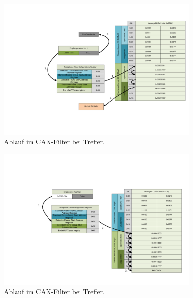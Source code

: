 \begin{figure}
	\centering
		\includegraphics[width=0.9\textwidth]{images/canfilterhit.pdf}
	\caption{Ablauf im CAN-Filter bei Treffer.}
	\label{fig.canfilterhit}
\end{figure}

\begin{figure}
	\centering
		\includegraphics[width=0.9\textwidth]{images/canfiltermiss.pdf}
	\caption{Ablauf im CAN-Filter bei Treffer.}
	\label{fig.canfiltermiss}
\end{figure}

